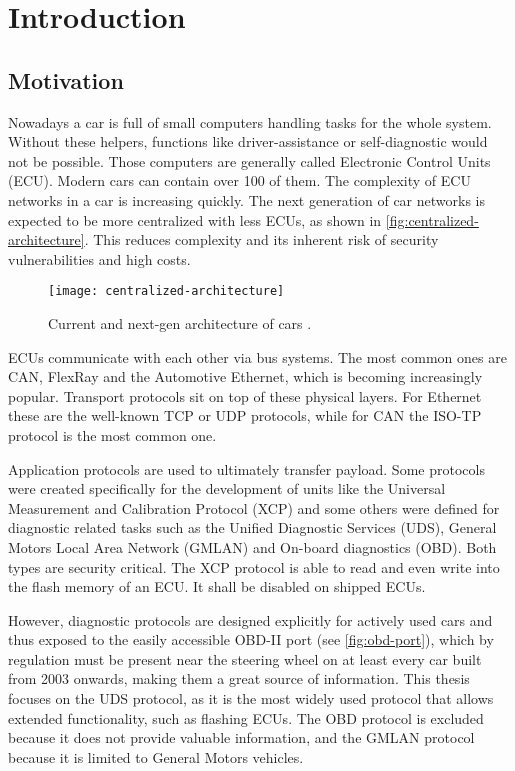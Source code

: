 \chapter{Introduction}
\label{sec:introduction}

\section{Motivation}
Nowadays a car is full of small computers handling tasks for the whole system. Without these helpers, functions like driver-assistance or self-diagnostic would not be possible. Those computers are generally called Electronic Control Units (ECU). Modern cars can contain over 100 of them. The complexity of ECU networks in a car is increasing quickly. The next generation of car networks is expected to be more centralized with less ECUs, as shown in \autoref{fig:centralized-architecture}. This reduces complexity and its inherent risk of security vulnerabilities and high costs.

\begin{figure}[htb]
    \centering
    \texttt{[image: centralized-architecture]}
    \caption{Current and next-gen architecture of cars \cite{car-architecture}.}
    \label{fig:centralized-architecture}
\end{figure}

ECUs communicate with each other via bus systems. The most common ones are CAN, FlexRay and the Automotive Ethernet, which is becoming increasingly popular. Transport protocols sit on top of these physical layers. For Ethernet these are the well-known TCP or UDP protocols, while for CAN the ISO-TP protocol is the most common one.

Application protocols are used to ultimately transfer payload. Some protocols were created specifically for the development of units like the Universal Measurement and Calibration Protocol (XCP) and some others were defined for diagnostic related tasks such as the Unified Diagnostic Services (UDS), General Motors Local Area Network (GMLAN) and On-board diagnostics (OBD). Both types are security critical. The XCP protocol is able to read and even write into the flash memory of an ECU. It shall be disabled on shipped ECUs.

However, diagnostic protocols are designed explicitly for actively used cars and thus exposed to the easily accessible OBD-II port (see \autoref{fig:obd-port}), which by regulation must be present near the steering wheel on at least every car built from 2003 onwards, making them a great source of information. This thesis focuses on the UDS protocol, as it is the most widely used protocol that allows extended functionality, such as flashing ECUs. The OBD protocol is excluded because it does not provide valuable information, and the GMLAN protocol because it is limited to General Motors vehicles.

